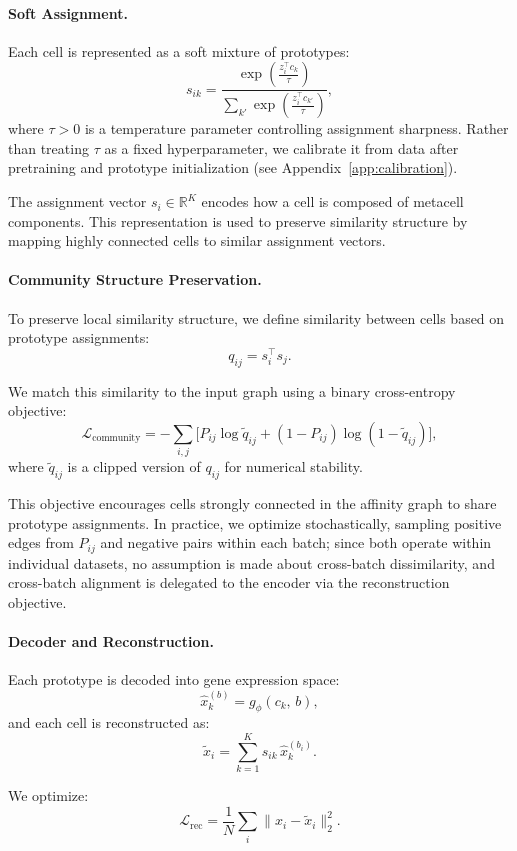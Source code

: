 \paragraph{Soft Assignment.}
Each cell is represented as a soft mixture of prototypes:
\[
s_{ik} =
\frac{\exp\left( \frac{z_i^\top c_k}{\tau} \right)}
{\sum_{k'} \exp\left( \frac{z_i^\top c_{k'}}{\tau} \right)},
\]
where $\tau > 0$ is a temperature parameter controlling assignment sharpness. Rather than treating $\tau$ as a fixed hyperparameter, we calibrate it from data after pretraining and prototype initialization (see Appendix~\ref{app:calibration}).

The assignment vector $s_i \in \mathbb{R}^K$ encodes how a cell is composed of metacell components. This representation is used to preserve similarity structure by mapping highly connected cells to similar assignment vectors.

\paragraph{Community Structure Preservation.}
To preserve local similarity structure, we define similarity between cells based on prototype assignments:
\[
q_{ij} = s_i^\top s_j.
\]

We match this similarity to the input graph using a binary cross-entropy objective:
\[
\mathcal{L}_{\text{community}}
=
-\sum_{i,j}
\Big[
P_{ij}\log \tilde q_{ij}
+
(1-P_{ij})\log(1-\tilde q_{ij})
\Big],
\]
where $\tilde q_{ij}$ is a clipped version of $q_{ij}$ for numerical stability.

This objective encourages cells strongly connected in the affinity graph to share prototype assignments. In practice, we optimize stochastically, sampling positive edges from $P_{ij}$ and negative pairs within each batch; since both operate within individual datasets, no assumption is made about cross-batch dissimilarity, and cross-batch alignment is delegated to the encoder via the reconstruction objective.

\paragraph{Decoder and Reconstruction.}
Each prototype is decoded into gene expression space:
\[
\hat{x}_k^{(b)} = g_\phi(c_k,\, b),
\]
and each cell is reconstructed as:
\[
\tilde{x}_i = \sum_{k=1}^K s_{ik}\, \hat{x}_k^{(b_i)}.
\]

We optimize:
\[
\mathcal{L}_{\text{rec}} = \frac{1}{N} \sum_i \|x_i - \tilde{x}_i\|_2^2.
\]

